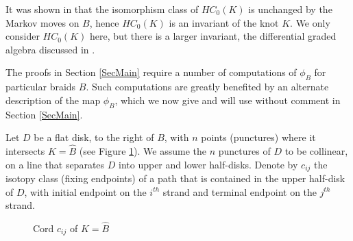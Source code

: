 \documentclass{amsart}[11pt,fullpage]
\theoremstyle{definition}
\begin{document}
  It was shown in \cite{Ng08} that the isomorphism class of $HC_0(K)$ is unchanged by the Markov moves on $B$, hence $HC_0(K)$ is an invariant of the knot $K$. We only consider $HC_0(K)$ here, but there is a larger invariant, the differential graded algebra discussed in \cite{Ng12}.

  The proofs in Section \ref{SecMain} require a number of computations of $\phi_B$ for particular braids $B$. Such computations are greatly benefited by an alternate description of the map $\phi_B$, which we now give and will use without comment in Section \ref{SecMain}.

  Let $D$ be a flat disk, to the right of $B$, with $n$ points (punctures) where it intersects $K=\widehat{B}$ (see Figure \ref{FigA_nGens}). We assume the $n$ punctures of $D$ to be collinear, on a line that separates $D$ into upper and lower half-disks. Denote by $c_{ij}$ the isotopy class (fixing endpoints) of a path that is contained in the upper half-disk of $D$, with initial endpoint on the $i^{th}$ strand and terminal endpoint on the $j^{th}$ strand.

  \begin{figure}[ht]
\caption{Cord $c_{ij}$ of $K=\widehat B$}
\label{FigA_nGens}
\end{figure}
\end{document}
